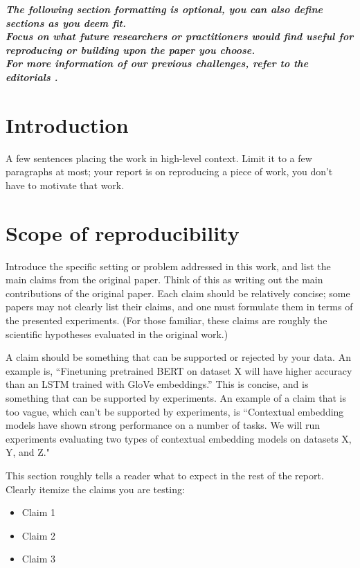\textit{\textbf{The following section formatting is \textbf{optional}, you can also define sections as you deem fit.
\\
Focus on what future researchers or practitioners would find useful for reproducing or building upon the paper you choose.\\
For more information of our previous challenges, refer to the editorials \cite{Sinha:2022,Sinha:2021,Sinha:2020,Pineau:2019}.
}}
\section{Introduction}
A few sentences placing the work in high-level context. Limit it to a few paragraphs at most; your report is on reproducing a piece of work, you don’t have to motivate that work.

\section{Scope of reproducibility}
\label{sec:claims}

Introduce the specific setting or problem addressed in this work, and list the main claims from the original paper. Think of this as writing out the main contributions of the original paper. Each claim should be relatively concise; some papers may not clearly list their claims, and one must formulate them in terms of the presented experiments. (For those familiar, these claims are roughly the scientific hypotheses evaluated in the original work.)

A claim should be something that can be supported or rejected by your data. An example is, ``Finetuning pretrained BERT on dataset X will have higher accuracy than an LSTM trained with GloVe embeddings.''
This is concise, and is something that can be supported by experiments.
An example of a claim that is too vague, which can't be supported by experiments, is ``Contextual embedding models have shown strong performance on a number of tasks. We will run experiments evaluating two types of contextual embedding models on datasets X, Y, and Z."

This section roughly tells a reader what to expect in the rest of the report. Clearly itemize the claims you are testing:
\begin{itemize}
    \item Claim 1
    \item Claim 2
    \item Claim 3
\end{itemize}

